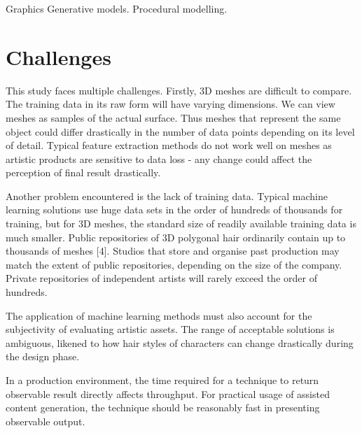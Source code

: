 \documentclass[a4paper, fontsize=15pt, onecolumn]{article} %
\numberwithin{equation}{section} %
\numberwithin{figure}{section} %
\numberwithin{table}{section} %
\begin{document}
Graphics
Generative models.
Procedural modelling.

\section{Challenges}
This study faces multiple challenges. Firstly, 3D meshes are difficult to compare. The training data in its raw form will have varying dimensions. We can view meshes as samples of the actual surface. Thus meshes that represent the same object could differ drastically in the number of data points depending on its level of detail. Typical feature extraction methods do not work well on meshes as artistic products are sensitive to data loss - any change could affect the perception of final result drastically.

Another problem encountered is the lack of training data. Typical machine learning solutions use huge data sets in the order of hundreds of thousands for training, but for 3D meshes, the standard size of readily available training data is much smaller. Public repositories of 3D polygonal hair ordinarily contain up to thousands of meshes [4]. Studios that store and organise past production may match the extent of public repositories, depending on the size of the company. Private repositories of independent artists will rarely exceed the order of hundreds. 

The application of machine learning methods must also account for the subjectivity of evaluating artistic assets. The range of acceptable solutions is ambiguous, likened to how hair styles of characters can change drastically during the design phase.

In a production environment, the time required for a technique to return observable result directly affects throughput. For practical usage of assisted content generation, the technique should be reasonably fast in presenting observable output.
\end{document}
